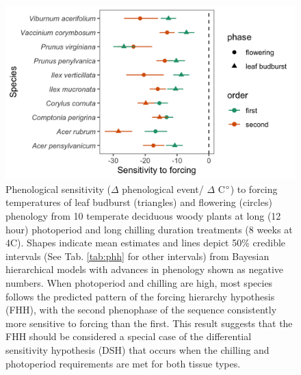 \documentclass[12pt]{article}\usepackage[]{graphicx}\usepackage[]{color}
\begin{document}
\begin{figure}[h!]
    \centering
         \includegraphics[width=\textwidth]{..//Plots/Flobuds_manuscript_figs/PHH_plot.png} 
    \caption{Phenological sensitivity ($\Delta$ phenological event/ $\Delta$ C$\degree$) to forcing temperatures of leaf budburst (triangles) and flowering (circles) phenology from 10 temperate deciduous woody plants at long (12 hour) photoperiod and long chilling duration treatments (8 weeks at 4\degree C). Shapes indicate mean estimates and lines depict 50\% credible intervals (See Tab. \ref{tab:phh} for other intervals) from Bayesian hierarchical models with advances in phenology shown as negative numbers. When photoperiod and chilling are high, most species follows the predicted pattern of the forcing hierarchy hypothesis (FHH), with the second phenophase of the sequence consistently more sensitive to forcing than the first. This result suggests that the FHH should be considered a special case of the differential sensitivity hypothesis (DSH) that occurs when the chilling and photoperiod requirements are met for both tissue types.}
    \label{fig:FHH}
\end{figure}
\end{document}
